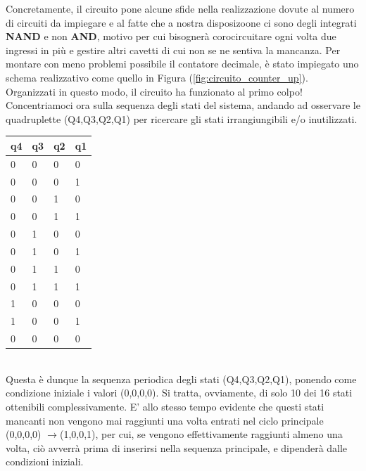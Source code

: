 \documentclass[journal, a4paper]{IEEEtran}
\begin{document}
Concretamente, il circuito pone alcune sfide nella realizzazione dovute al numero di circuiti da impiegare e al fatte che a nostra disposizoone ci sono degli integrati \textbf{NAND} e non \textbf{AND}, motivo per cui bisognerà corocircuitare ogni volta due ingressi in più e gestire altri cavetti di cui non se ne sentiva la mancanza. Per montare con meno problemi possibile il contatore decimale, è stato impiegato uno schema realizzativo come quello in Figura (\ref{fig:circuito_counter_up}). Organizzati in questo modo, il circuito ha funzionato al primo colpo!\\

Concentriamoci ora sulla sequenza degli stati del sistema, andando ad osservare le quadruplette (Q4,Q3,Q2,Q1) per ricercare gli stati irrangiungibili e/o inutilizzati.

\begin{table}[h]
\centering
\begin{tabular}{l|l|l|l}
\textbf{q4} &\textbf{ q3} & \textbf{q2} & \textbf{q1} \\
\hline
0 & 0 & 0 & 0 \\

0 & 0 & 0 & 1 \\

0 & 0 & 1 & 0 \\

0 & 0 & 1 & 1 \\

0 & 1 & 0 & 0 \\

0 & 1 & 0 & 1 \\

0 & 1 & 1 & 0 \\

0 & 1 & 1 & 1 \\

1 & 0 & 0 & 0 \\

1 & 0 & 0 & 1 \\

0 & 0 & 0 & 0 \\
\hline
\end{tabular}
\end{table}
~\\

Questa è dunque la sequenza periodica degli stati (Q4,Q3,Q2,Q1), ponendo come condizione iniziale i valori (0,0,0,0). Si tratta, ovviamente, di solo 10 dei 16 stati ottenibili complessivamente. E' allo stesso tempo evidente che questi stati mancanti non vengono mai raggiunti una volta entrati nel ciclo principale (0,0,0,0) $\rightarrow$(1,0,0,1), per cui, se vengono effettivamente raggiunti almeno una volta, ciò avverrà prima di inserirsi nella sequenza principale, e dipenderà dalle condizioni iniziali.\\
\end{document}
